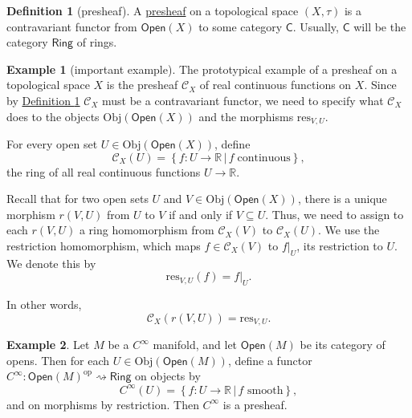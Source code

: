 \documentclass[a4paper]{report}
\newcommand{\R}{\mathbb{R}}
\newcommand{\defn}[1]{\ul{#1}}
\newcommand{\Obj}{\mathrm{Obj}}
\theoremstyle{definition}
\newtheorem{definition}{Definition}[section]
\newtheorem{example}{Example}[section]
\theoremstyle{plain}
\theoremstyle{remark}
\begin{document}
\begin{definition}[presheaf] 
  \label{def:presheaf}
  A \defn{presheaf} on a topological space $(X,\tau)$ is a contravariant functor from $\mathsf{Open}(X)$ to some category $\mathsf{C}$. Usually, $\mathsf{C}$ will be the category $\mathsf{Ring}$ of rings.  
\end{definition}

\begin{example}[important example] 
  \label{eg:functionpresheaf} 
  The prototypical example of a presheaf on a topological space $X$ is the presheaf $\mathcal{C}_{X}$ of real continuous functions on $X$. Since by \hyperref[def:presheaf]{Definition \ref*{def:presheaf}} $\mathcal{C}_X$ must be a contravariant functor, we need to specify what $\mathcal{C}_{X}$ does to the objects $\Obj(\mathsf{Open}(X))$ and the morphisms $\mathrm{res}_{V,U}$.

  For every open set $U \in \Obj(\mathsf{Open}(X))$, define
  \begin{equation*} 
    \mathcal{C}_{X}(U) = \left\{ f\colon U \to \R\,\big| \, f\; \mathrm{ continuous} \right\}, 
  \end{equation*} 
  the ring of all real continuous functions $U \to \R$.

  Recall that for two open sets $U$ and $V \in \Obj(\mathsf{Open}(X))$, there is a unique morphism $r(V,U)$ from $U$ to $V$ if and only if $V \subseteq U$. Thus, we need to assign to each $r(V,U)$ a ring homomorphism from $\mathcal{C}_{X}(V)$ to $\mathcal{C}_{X}(U)$. We use the restriction homomorphism, which maps $f \in \mathcal{C}_{X}(V)$ to $f|_{U}$, its restriction to $U$. We denote this by
  \begin{equation*}
    \mathrm{res}_{V,U}(f) = f|_{U}.
  \end{equation*}

  In other words,
  \begin{equation*}
    \mathcal{C}_{X}(r(V,U)) = \mathrm{res}_{V,U}.
  \end{equation*}
\end{example}

\begin{example}
  \label{eg:smoothpresheaf}
  Let $M$ be a $C^{\infty}$ manifold, and let $\mathsf{Open}(M)$ be its category of opens. Then for each $U \in \Obj(\mathsf{Open}(M))$, define a functor $C^{\infty}\colon \mathsf{Open}(M)^{\text{op}} \rightsquigarrow \mathsf{Ring}$ on objects by
  \begin{equation*}
    C^{\infty}(U) = \left\{ f\colon U \to \R\,\big|\, f\text{ smooth} \right\},
  \end{equation*}
  and on morphisms by restriction. Then $C^{\infty}$ is a presheaf.
\end{example}
\end{document}
